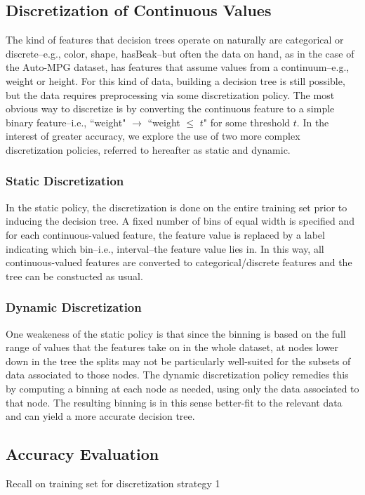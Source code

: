 \documentclass[12pt, conference, compsocconf]{IEEEtran}
\begin{document}
\subsection{Discretization of Continuous Values}
The kind of features that decision trees operate on naturally are categorical or discrete--e.g., color, shape, hasBeak--but often the data on hand, as in the case of the Auto-MPG dataset, has features that assume values from a continuum--e.g., weight or height.
For this kind of data, building a decision tree is still possible, but the data requires preprocessing via some discretization policy. 
The most obvious way to discretize is by converting the continuous feature to a simple binary feature--i.e., ``weight" $\rightarrow$ ``weight $\leq$ $t$" for some threshold $t$. 
In the interest of greater accuracy, we explore the use of two more complex discretization policies, referred to hereafter as static and dynamic.

\subsubsection{Static Discretization}
In the static policy, the discretization is done on the entire training set prior to inducing the decision tree. 
A fixed number of bins of equal width is specified and for each continuous-valued feature, the feature value is replaced by a label indicating which bin--i.e., interval--the feature value lies in. 
In this way, all continuous-valued features are converted to categorical/discrete features and the tree can be constucted as usual. 

\subsubsection{Dynamic Discretization}
One weakeness of the static policy is that since the binning is based on the full range of values that the features take on in the whole dataset, at nodes lower down in the tree the splits may not be particularly well-suited for the subsets of data associated to those nodes. 
The dynamic discretization policy remedies this by computing a binning at each node as needed, using only the data associated to that node. 
The resulting binning is in this sense better-fit to the relevant data and can yield a more accurate decision tree. 

\subsection{Accuracy Evaluation}
Recall on training set for discretization strategy 1
\end{document}
